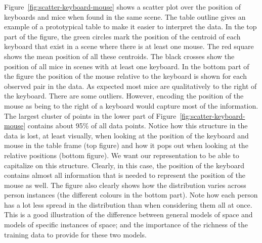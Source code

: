 \documentclass[letterpaper, 10 pt, conference]{ieeeconf}
\begin{document}
Figure~\ref{fig:scatter-keyboard-mouse} shows a scatter plot 
over the position of keyboards and mice when found in the same scene. The 
table outline gives an example of a prototypical table to make it easier to 
interpret the data. 
In the top part of the figure, the green circles mark the position of the 
centroid of each 
keyboard that exist in a scene where there is at least one mouse. The red 
square shows the mean position of all these centroids. The black 
crosses show the position of all mice in scenes with at least one keyboard. 
In the bottom part of the figure the position of the mouse 
relative to the keyboard is shown for each observed pair in the data. As 
expected most mice are qualitatively to the right of the keyboard. There are 
some outliers. However,  
encoding the position of the mouse as being to the right of a keyboard would 
capture most of the information. The largest cluster of points in the lower 
part of Figure~\ref{fig:scatter-keyboard-mouse} contains about 95\% 
of all data points. Notice how this structure in the data is lost, at least 
visually, when looking at the position of the keyboard and mouse in the 
table frame (top figure) and how it pops out when looking at the relative 
positions (bottom figure). We want our representation to be able to 
capitalize on this structure. Clearly, in this case, the position of the 
keyboard contains almost all information that is needed to represent the 
position of the mouse as well. The figure also clearly shows how the 
distribution varies across person instances (the different colours in the bottom 
part). Note how each person has a lot less spread in the distribution than 
when considering them all at once. This is a good illustration of the 
difference between general models of space and models of specific instances 
of space; and the importance of the richness of the training data to provide for these two models.
\end{document}
